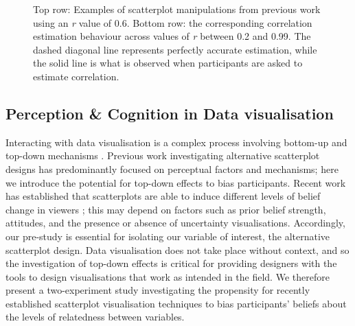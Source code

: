 \documentclass[sigconf]{acmart}
\begin{document}
\begin{figure}


\caption{\label{fig-previous-manipulations}Top row: Examples of
scatterplot manipulations from previous work using an \textit{r} value
of 0.6. Bottom row: the corresponding correlation estimation behaviour
across values of \textit{r} between 0.2 and 0.99. The dashed diagonal
line represents perfectly accurate estimation, while the solid line is
what is observed when participants are asked to estimate correlation.}

\end{figure}%

\subsection{Perception \& Cognition in Data
visualisation}\label{sec-perception-cognition}

Interacting with data visualisation is a complex process involving
bottom-up and top-down mechanisms
\citep{shah_2011, franconeri_2021, xiong_2022}. Previous work
investigating alternative scatterplot designs has predominantly focused
on perceptual factors and mechanisms; here we introduce the potential
for top-down effects to bias participants. Recent work has established
that scatterplots are able to induce different levels of belief change
in viewers \citep{karduni_2020, markant_2023}; this may depend on
factors such as prior belief strength, attitudes, and the presence or
absence of uncertainty visualisations. Accordingly, our pre-study is
essential for isolating our variable of interest, the alternative
scatterplot design. Data visualisation does not take place without
context, and so the investigation of top-down effects is critical for
providing designers with the tools to design visualisations that work as
intended in the field. We therefore present a two-experiment study
investigating the propensity for recently established scatterplot
visualisation techniques to bias participants' beliefs about the levels
of relatedness between variables.
\end{document}
